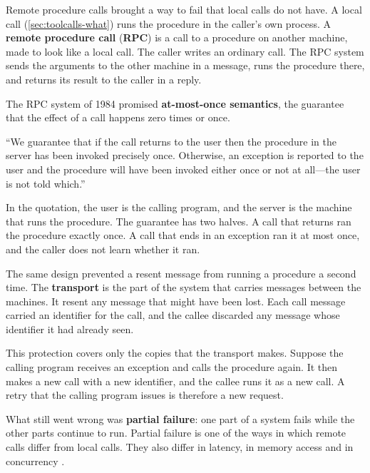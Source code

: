 Remote procedure calls brought a way to fail that local calls do not have. A local call
(\cref{sec:toolcalls-what}) runs the procedure in the caller's own process. A \textbf{remote
procedure call} (\textbf{RPC}) is a call to a procedure on another machine, made to look like a
local call. The caller writes an ordinary call. The RPC system sends the arguments to the other
machine in a message, runs the procedure there, and returns its result to the caller in a reply.

The RPC system of 1984 promised \textbf{at-most-once semantics}, the guarantee that the effect of a
call happens zero times or once.

\begin{definition}
\label{def:toolcalls-rpc}
``We guarantee that if the call returns to the user then the procedure in the server has been
invoked precisely once. Otherwise, an exception is reported to the user and the procedure will have
been invoked either once or not at all---the user is not told which.''
\citep[\S3.1]{birrell1984rpc}
\end{definition}

In the quotation, the user is the calling program, and the server is the machine that runs the
procedure. The guarantee has two halves. A call that returns ran the procedure exactly once. A call
that ends in an exception ran it at most once, and the caller does not learn whether it ran.

The same design prevented a resent message from running a procedure a second time. The
\textbf{transport} is the part of the system that carries messages between the machines. It resent
any message that might have been lost. Each call message carried an identifier for the call, and the
callee discarded any message whose identifier it had already seen.

This protection covers only the copies that the transport makes. Suppose the calling program
receives an exception and calls the procedure again. It then makes a new call with a new identifier,
and the callee runs it as a new call. A retry that the calling program issues is therefore a new
request.

What still went wrong was \textbf{partial failure}: one part of a system fails while the other parts
continue to run. Partial failure is one of the ways in which remote calls differ from local calls.
They also differ in latency, in memory access and in concurrency \citep[\S4]{waldo1994note}.

